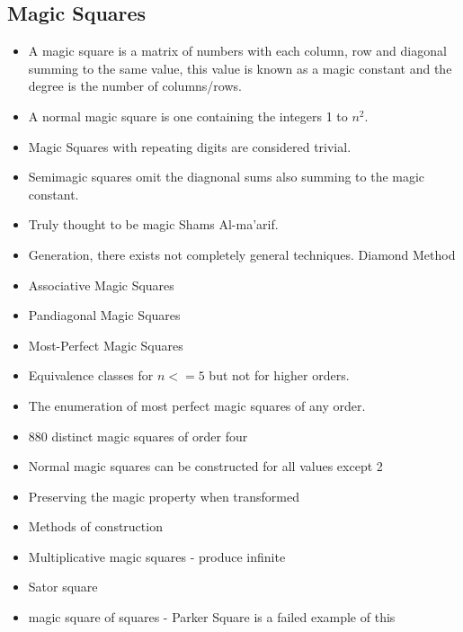 \documentclass[a4paper,12pt]{article}
\begin{document}
	\subsection{Magic Squares}

		\begin{itemize}
		\item{A magic square is a matrix of numbers with each column, row and diagonal summing to the same value, 
		this value is known as a magic constant and the degree is the number of columns/rows.}
		\item{A normal magic square is one containing the integers 1 to $n^2$.}
		\item{Magic Squares with repeating digits are considered trivial.}
		\item{Semimagic squares omit the diagnonal sums also summing to the magic constant.}

		\item{Truly thought to be magic Shams Al-ma'arif.}

		\item{Generation, there exists not completely general techniques. Diamond Method}

		\item{Associative Magic Squares}
		\item{Pandiagonal Magic Squares}
		\item{Most-Perfect Magic Squares}
		
		\item{Equivalence classes for $n<=5$ but not for higher orders.}
		\item{The enumeration of most perfect magic squares of any order.}

		\item{880 distinct magic squares of order four}

		\item{Normal magic squares can be constructed for all values except 2}
		\item{Preserving the magic property when transformed}

		\item{Methods of construction}

		\item{Multiplicative magic squares - produce infinite}

		\item{Sator square}

		\item{magic square of squares - Parker Square is a failed example of this}
		\end{itemize}
	
\end{document}
